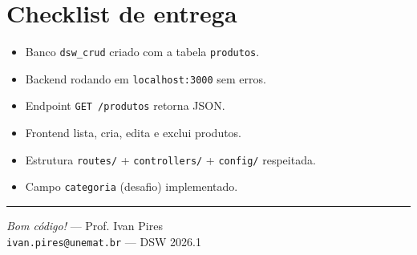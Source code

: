 \documentclass[11pt,a4paper]{article}
\begin{document}
\section{Checklist de entrega}

\begin{itemize}[label=$\square$, itemsep=2pt]
  \item Banco \texttt{dsw\_crud} criado com a tabela \texttt{produtos}.
  \item Backend rodando em \texttt{localhost:3000} sem erros.
  \item Endpoint \texttt{GET /produtos} retorna JSON.
  \item Frontend lista, cria, edita e exclui produtos.
  \item Estrutura \texttt{routes/} + \texttt{controllers/} + \texttt{config/} respeitada.
  \item Campo \texttt{categoria} (desafio) implementado.
\end{itemize}

\vspace{0.6cm}
\hrule
\vspace{0.3cm}
\begin{center}\small
\textit{Bom código!} --- Prof. Ivan Pires \\
\texttt{ivan.pires@unemat.br} --- DSW 2026.1
\end{center}
\end{document}
